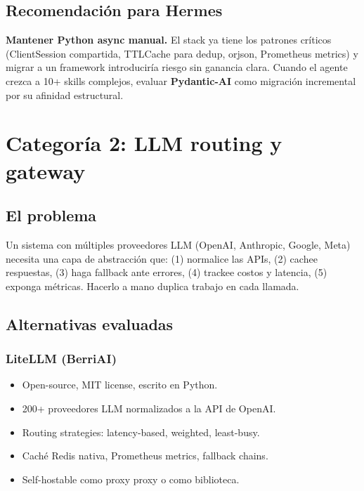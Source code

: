\documentclass[11pt,a4paper]{article}
\begin{document}
\subsection{Recomendación para Hermes}

\textbf{Mantener Python async manual.} El stack ya tiene los patrones críticos (ClientSession compartida, TTLCache para dedup, orjson, Prometheus metrics) y migrar a un framework introduciría riesgo sin ganancia clara. Cuando el agente crezca a 10+ skills complejos, evaluar \textbf{Pydantic-AI} como migración incremental por su afinidad estructural.

\newpage

\section{Categoría 2: LLM routing y gateway}

\subsection{El problema}

Un sistema con múltiples proveedores LLM (OpenAI, Anthropic, Google, Meta) necesita una capa de abstracción que: (1) normalice las APIs, (2) cachee respuestas, (3) haga fallback ante errores, (4) trackee costos y latencia, (5) exponga métricas. Hacerlo a mano duplica trabajo en cada llamada.

\subsection{Alternativas evaluadas}

\subsubsection{LiteLLM (BerriAI)}
\begin{itemize}[leftmargin=*,itemsep=0pt]
\item Open-source, MIT license, escrito en Python.
\item 200+ proveedores LLM normalizados a la API de OpenAI.
\item Routing strategies: latency-based, weighted, least-busy.
\item Caché Redis nativa, Prometheus metrics, fallback chains.
\item Self-hostable como proxy proxy o como biblioteca.
\end{itemize}
\end{document}
